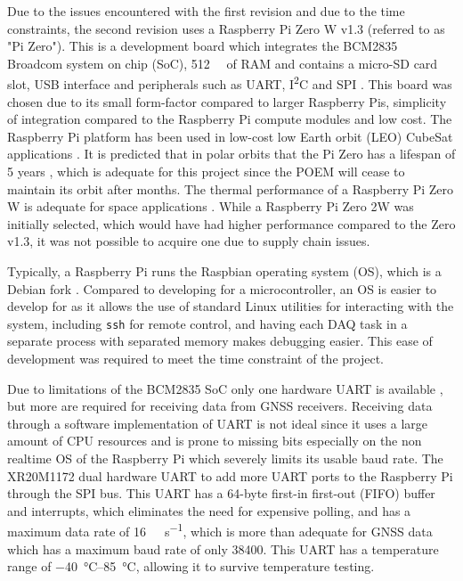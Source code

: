\documentclass[draft]{report}
\newcommand{\iic}{{I\textsuperscript{2}C}}
\begin{document}
Due to the issues encountered with the first revision and due to the time constraints, the second revision uses a Raspberry Pi Zero W v1.3 (referred to as "Pi Zero"). This is a development board which integrates the BCM2835 Broadcom system on chip (SoC), \SI{512}{\mega\byte} of RAM and contains a micro-SD card slot, USB interface and peripherals such as UART, {\iic} and SPI \cite{upton2016raspberry}. This board was chosen due to its small form-factor compared to larger Raspberry Pis, simplicity of integration compared to the Raspberry Pi compute modules and low cost. The Raspberry Pi platform has been used in low-cost low Earth orbit (LEO) CubeSat applications \cite{guertin2022raspberry}. It is predicted that in polar orbits that the Pi Zero has a lifespan of 5 years \cite{guertin2022raspberry}, which is adequate for this project since the POEM will cease to maintain its orbit after  months. The thermal performance of a Raspberry Pi Zero W is adequate for space applications \cite{guertin2022raspberry}. While a Raspberry Pi Zero 2W was initially selected, which would have had higher performance compared to the Zero v1.3, it was not possible to acquire one due to supply chain issues.

Typically, a Raspberry Pi runs the Raspbian operating system (OS), which is a Debian fork \cite{upton2016raspberry}. Compared to developing for a microcontroller, an OS is easier to develop for as it allows the use of standard Linux utilities for interacting with the system, including \texttt{ssh} for remote control, and having each DAQ task in a separate process with separated memory makes debugging easier. This ease of development was required to meet the time constraint of the project. %

Due to limitations of the BCM2835 SoC only one hardware UART is available \cite{upton2016raspberry}, but more are required for receiving data from GNSS receivers. Receiving data through a software implementation of UART is not ideal since it uses a large amount of CPU resources and is prone to missing bits especially on the non realtime OS of the Raspberry Pi which severely limits its usable baud rate. The XR20M1172 dual hardware UART to add more UART ports to the Raspberry Pi through the SPI bus. This UART has a 64-byte first-in first-out (FIFO) buffer and interrupts, which eliminates the need for expensive polling, and has a maximum data rate of \SI{16}{\mega\bit\per\second}, which is more than adequate for GNSS data \cite{maxlinear2022xr20m1172} which has a maximum baud rate of only \SI{38400}{\baud}. This UART has a temperature range of \SIrange{-40}{85}{\degreeCelsius}, allowing it to survive temperature testing.
\end{document}
